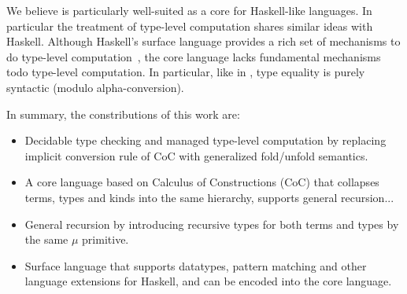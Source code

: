 We believe \name is particularly well-suited as a core for
Haskell-like languages. In particular the treatment of type-level computation
shares similar ideas with Haskell. Although Haskell's surface language
provides a rich set of mechanisms to do type-level
computation~\cite{}, the core language lacks fundamental mechanisms
todo type-level computation. In particular, like in \name, type equality is purely
syntactic (modulo alpha-conversion). 

\begin{comment}
 and there is no type-level
abstraction. In other words in Haskell, mechanisms such as type
classes and type families

Although it may seem that forcing each step of computation 
at the type-level to be explicit will prevent convinient use of 
type-level computation.

Point about the treatment of type-level computation in Haskell. Haskell's
core language has type applications, but no type-level lambda. Equality 
is syntactic modulo alpha-conversion. This design choice was rooted in the 
desire to support Hindley-Milner type-inference... 
\end{comment}

In summary, the constributions of this work are:

\begin{itemize}

\item Decidable type checking and managed type-level computation by
  replacing implicit conversion rule of CoC with generalized
  \textsf{fold}/\textsf{unfold} semantics.

\item A core language based on Calculus of Constructions (CoC) that
  collapses terms, types and kinds into the same hierarchy, supports
  general recursion...

\item General recursion by introducing recursive types for both terms
  and types by the same $\mu$ primitive.

\item Surface language that supports datatypes, pattern matching and
  other language extensions for Haskell, and can be encoded into the
  core language.

\end{itemize}



